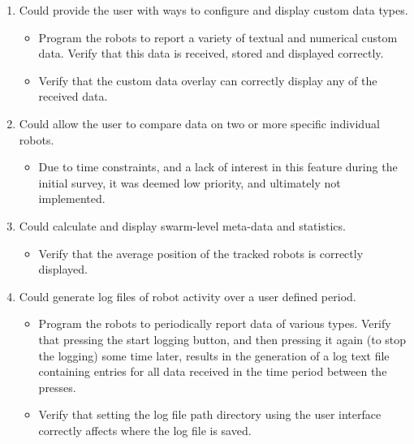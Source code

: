 \begin{enumerate}[label=S\arabic*.]
 \item Could provide the user with ways to configure and display custom data types.
 \begin{itemize}
  \item Program the robots to report a variety of textual and numerical custom data. Verify that this data is received, stored and displayed correctly.
  \item Verify that the custom data overlay can correctly display any of the received data.
 \end{itemize}
 
 \item Could allow the user to compare data on two or more specific individual robots.
 \begin{itemize}
  \item Due to time constraints, and a lack of interest in this feature during the initial survey, it was deemed low priority, and ultimately not implemented.
 \end{itemize}
 
 \item Could calculate and display swarm-level meta-data and statistics.
 \begin{itemize}
  \item Verify that the average position of the tracked robots is correctly displayed.
 \end{itemize}
 
 \item Could generate log files of robot activity over a user defined period.
 \begin{itemize}
  \item Program the robots to periodically report data of various types. Verify that pressing the start logging button, and then pressing it again (to stop the logging) some time later, results in the generation of a log text file containing entries for all data received in the time period between the presses.
  \item Verify that setting the log file path directory using the user interface correctly affects where the log file is saved.
 \end{itemize}
\end{enumerate}

